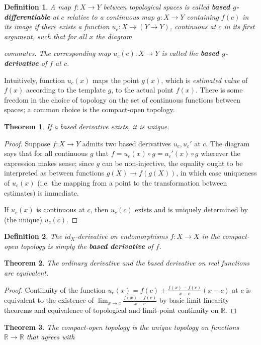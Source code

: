 \documentclass{article}
\newtheorem{thm}{Theorem}
\newtheorem*{define}{Definition}
\begin{document}
\begin{define}
  A map $f: X\to Y$ between topological spaces is called \textbf{based $g$-differentiable} at $c$ relative to a continuous map $g: X \to Y$
  containing $f(c)$ in its image if there exists a function $u_{c}: X \to (Y \to Y)$, continuous at $c$ in its first argument,
  such that for all $x$ the diagram
  \begin{center}
  \end{center}
  commutes.
  The corresponding map $u_{c}(c): X \to Y$ is called the \textbf{based $g$-derivative} of $f$ at $c$.
\end{define}

Intuitively, function $u_c(x)$ maps the point $g(x)$, which is \textit{estimated value} of $f(x)$ according to the template $g$, to the actual point $f(x)$.
There is some freedom in the choice of topology on the set of continuous functions between spaces; a common choice is the compact-open topology.

\begin{thm}
  If a based derivative exists, it is unique.
\end{thm}

\begin{proof}
  Suppose $f: X \to Y$ admits two based derivatives $u_{c}, u_{c}'$ at $c$.
  The diagram says that for all continuous $g$ that $f = u_{c}(x) \circ g = u_{c}'(x) \circ g$ wherever the expression makes sense;
  since $g$ can be non-injective, the equality ought to be interpreted as between functions $g(X) \to f(g(X))$,
  in which case uniqueness of $u_{c}(x)$ (i.e. the mapping from a point to the transformation between estimates) is immediate.

  If $u_{c}(x)$ is continuous at $c$, then $u_{c}(c)$ exists and is uniquely determined by (the unique) $u_{c}(c)$.
\end{proof}


\begin{define}
  The $id_{X}$-derivative on endomorphisms $f: X \to X$ in the compact-open topology is simply the \textbf{based derivative} of $f$.
\end{define}


\begin{thm}
  The ordinary derivative and the based derivative on real functions are equivalent.
\end{thm}

\begin{proof}
  Continuity of the function $u_{c}(x) = f(c) + \frac{f(x) - f(c)}{x - c}(x - c)$ at $c$ is equivalent to the existence of
  $\lim_{x \to c}\frac{f(x) - f(c)}{x - c}$ by basic limit linearity theorems and equivalence of topological and limit-point continuity on $\mathbb{R}$.
\end{proof}

\begin{thm}
  The compact-open topology is the unique topology on functions $\mathbb{R} \to \mathbb{R}$ that agrees with
\end{thm}
\end{document}
